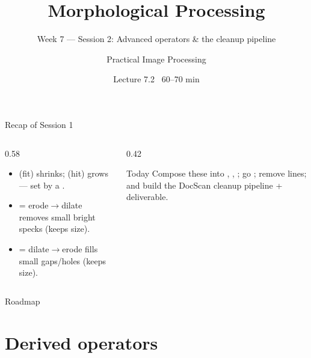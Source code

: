 \documentclass[10pt,aspectratio=169]{beamer}
\title{Morphological Processing}
\subtitle{Week 7 — Session 2: Advanced operators \& the cleanup pipeline}
\author{Practical Image Processing}
\date{Lecture 7.2 \textbullet\ 60--70 min}
\begin{document}
\maketitle

\begin{frame}{Recap of Session 1}
  \begin{columns}[T]
    \begin{column}{0.58\textwidth}
      \begin{itemize}
        \item {} (fit) shrinks;  (hit) grows — set by a .
        \item {} = erode$\to$dilate removes small bright specks (keeps size).
        \item {} = dilate$\to$erode fills small gaps/holes (keeps size).
      \end{itemize}
    \end{column}
    \begin{column}{0.42\textwidth}
      \begin{alertblock}{Today}
        Compose these into , , ; go ; remove lines; and build the DocScan cleanup pipeline + deliverable.
      \end{alertblock}
    \end{column}
  \end{columns}
\end{frame}

\begin{frame}{Roadmap}\tableofcontents\end{frame}

\section{Derived operators}
\end{document}
